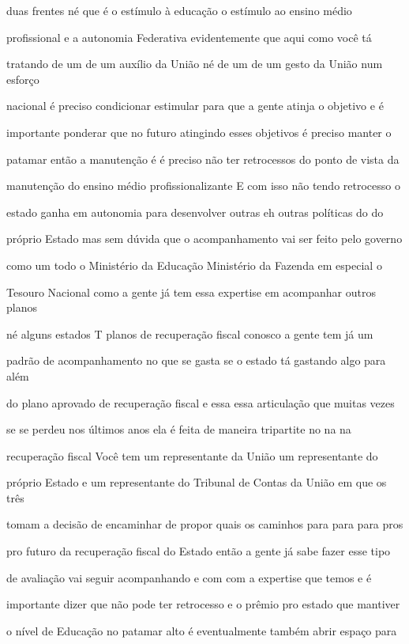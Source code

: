 \documentclass[a4paper,12pt]{article}
\begin{document}
duas frentes né que é o estímulo à educação o estímulo ao ensino médio

profissional e a autonomia Federativa evidentemente que aqui como você tá

tratando de um de um auxílio da União né de um de um gesto da União num esforço

nacional é preciso condicionar estimular para que a gente atinja o objetivo e é

importante ponderar que no futuro atingindo esses objetivos é preciso manter o

patamar então a manutenção é é preciso não ter retrocessos do ponto de vista da

manutenção do ensino médio profissionalizante E com isso não tendo retrocesso o

estado ganha em autonomia para desenvolver outras eh outras políticas do do

próprio Estado mas sem dúvida que o acompanhamento vai ser feito pelo governo

como um todo o Ministério da Educação Ministério da Fazenda em especial o

Tesouro Nacional como a gente já tem essa expertise em acompanhar outros planos

né alguns estados T planos de recuperação fiscal conosco a gente tem já um

padrão de acompanhamento no que se gasta se o estado tá gastando algo para além

do plano aprovado de recuperação fiscal e essa essa articulação que muitas vezes

se se perdeu nos últimos anos ela é feita de maneira tripartite no na na

recuperação fiscal Você tem um representante da União um representante do

próprio Estado e um representante do Tribunal de Contas da União em que os três

tomam a decisão de encaminhar de propor quais os caminhos para para para pros

pro futuro da recuperação fiscal do Estado então a gente já sabe fazer esse tipo

de avaliação vai seguir acompanhando e com com a expertise que temos e é

importante dizer que não pode ter retrocesso e o prêmio pro estado que mantiver

o nível de Educação no patamar alto é eventualmente também abrir espaço para
\end{document}
